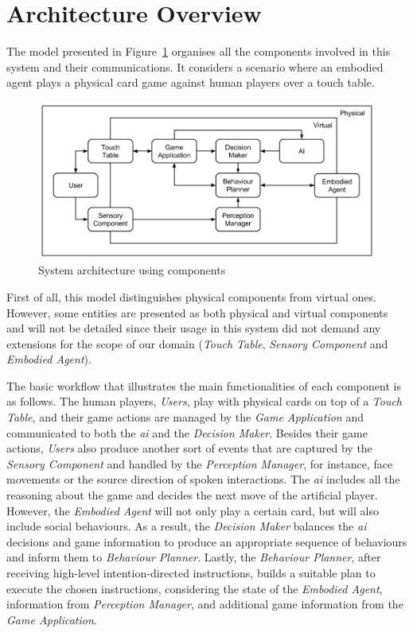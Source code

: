 \section{Architecture Overview}
\label{section:architecture_overview}

The model presented in Figure~\ref{fig:model} organises all the components involved in this system and their communications.
It considers a scenario where an embodied agent plays a physical card game against human players over a touch table.

\begin{figure}[ht]
  \centering
    \includegraphics[width=1\textwidth]{./img/architecture}
  \caption{System architecture using components}
\label{fig:model}
\end{figure}

First of all, this model distinguishes physical components from virtual ones.
However, some entities are presented as both physical and virtual components and will not be detailed since their usage in this system did not demand any extensions for the scope of our domain (\emph{Touch Table}, \emph{Sensory Component} and \emph{Embodied Agent}).

The basic workflow that illustrates the main functionalities of each component is as follows.
The human players, \emph{Users}, play with physical cards on top of a \emph{Touch Table}, and their game actions are managed by the \emph{Game Application} and communicated to both the \emph{\ac{ai}} and the \emph{Decision Maker}.
Besides their game actions, \emph{Users} also produce another sort of events that are captured by the \emph{Sensory Component} and handled by the \emph{Perception Manager}, for instance, face movements or the source direction of spoken interactions.
The \emph{\ac{ai}} includes all the reasoning about the game and decides the next move of the artificial player.
However, the \emph{Embodied Agent} will not only play a certain card, but will also include social behaviours.
As a result, the \emph{Decision Maker} balances the \emph{\ac{ai}} decisions and game information to produce an appropriate sequence of behaviours and inform them to \emph{Behaviour Planner}.
Lastly, the \emph{Behaviour Planner}, after receiving high-level intention-directed instructions, builds a suitable plan to execute the chosen instructions, considering the state of the \emph{Embodied Agent}, information from \emph{Perception Manager}, and additional game information from the \emph{Game Application}.

